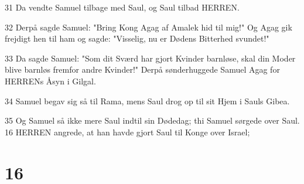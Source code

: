 \par 31 Da vendte Samuel tilbage med Saul, og Saul tilbad HERREN.
\par 32 Derpå sagde Samuel: "Bring Kong Agag af Amalek hid til mig!" Og Agag gik frejdigt hen til ham og sagde: "Visselig, nu er Dødens Bitterhed svundet!"
\par 33 Da sagde Samuel: "Som dit Sværd har gjort Kvinder barnløse, skal din Moder blive barnløs fremfor andre Kvinder!" Derpå sønderhuggede Samuel Agag for HERRENs Åsyn i Gilgal.
\par 34 Samuel begav sig så til Rama, mens Saul drog op til sit Hjem i Sauls Gibea.
\par 35 Og Samuel så ikke mere Saul indtil sin Dødedag; thi Samuel sørgede over Saul. 16 HERREN angrede, at han havde gjort Saul til Konge over Israel;

\chapter{16}

